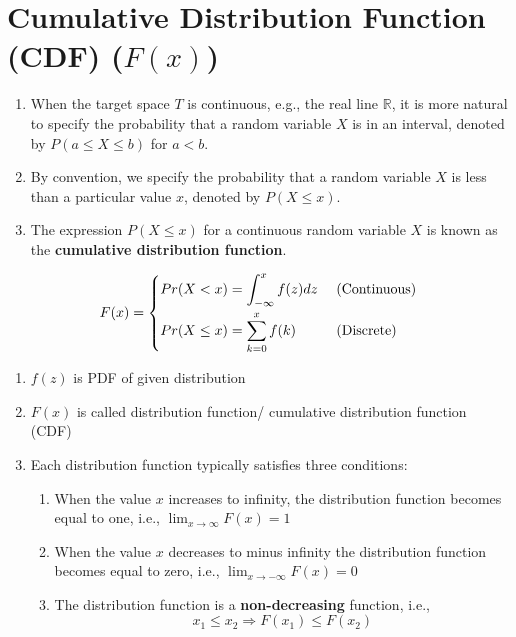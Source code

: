 \chapter{Cumulative Distribution Function (CDF) ($F(x)$) \cite{ism-1,mfml-1}}\label{Cumulative Distribution Function (CDF)}

\begin{enumerate}
    \item When the target space $T$ is continuous, e.g., the real line $\mathbb{R}$, it is more natural to specify the probability that a random variable $X$ is in an interval, denoted by $P(a \leq X \leq b)$ for $a < b$. \cite{mfml-1}
    \item By convention, we specify the probability that a random variable $X$ is less than a particular value $x$, denoted by $P(X \leq x)$. \cite{mfml-1}
    \item The expression $P(X \leq x)$ for a continuous random variable $X$ is known as the \textbf{cumulative distribution function}. \cite{mfml-1}

\end{enumerate}

\begin{align*}
    F(x) 
    = \begin{cases}
        Pr(X < x) = \displaystyle\int_{-\infty}^{x} f(z) dz & \text{ (Continuous)}\\[2ex]
        Pr(X \leq x) = \displaystyle\sum_{k=0}^x f(k) & \text{ (Discrete)}\\
    \end{cases}
\end{align*}


\begin{enumerate}
    \item $f(z)$ is PDF of given distribution

    \item $F(x)$ is called distribution function/ cumulative distribution function (CDF)

    \item Each distribution function typically satisfies three conditions:
    \begin{enumerate}
        \item When the value $x$ increases to infinity, the distribution function becomes equal to one, i.e., $\displaystyle\lim_{x\to \infty} F(x) = 1$

        \item When the value $x$ decreases to minus infinity the distribution function becomes equal to zero, i.e., $\displaystyle\lim_{x\to-\infty} F(x) = 0$

        \item The distribution function is a \textbf{non-decreasing} function, i.e.,
        \[
            x_1 \leq x_2 \Rightarrow F(x_1) \leq F(x_2)
        \]
        
    \end{enumerate}
    
\end{enumerate}

